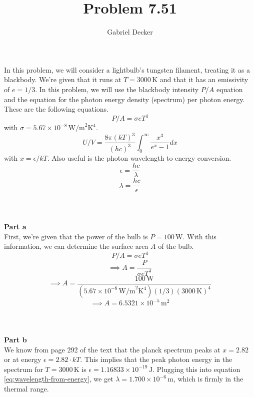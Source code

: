 \documentclass[12pt]{article}
\title{Problem 7.51}
\author{Gabriel Decker}
\begin{document}
\maketitle
\begin{flushleft}



In this problem, we will consider a lightbulb's tungsten filament, treating it as a blackbody.
We're given that it runs at $T=3000\,\text{K}$ and that it has an emissivity of $e=1/3$.
In this problem, we will use the blackbody intensity $P/A$ equation and the equation for the photon energy density (spectrum) per photon energy.
These are the following equations.
\begin{equation}
    P/A=\sigma eT^4
\end{equation}
    with $\sigma=5.67\times10^{-8}\,\text{W/m}^2\text{K}^4$.
\begin{equation}
    U/V=\frac{8\pi(kT)^3}{(hc)^3}\int_0^\infty\frac{x^3}{e^{x}-1}dx
    \label{eq:energy-density}
\end{equation}
with $x=\epsilon/kT$.
Also useful is the photon wavelength to energy conversion.
\begin{equation}
    \epsilon=\frac{hc}{\lambda}
    \label{eq:energy-from-wavelength}
\end{equation}
\begin{equation}
    \lambda=\frac{hc}{\epsilon}
    \label{eq:wavelength-from-energy}
\end{equation}\\~\\~\\


\textbf{Part a}\\
First, we're given that the power of the bulb is $P=100\,\text{W}$.
With this information, we can determine the surface area $A$ of the bulb.
$$P/A=\sigma eT^4$$
$$\implies A=\frac{P}{\sigma eT^4}$$
$$\implies A=\frac{100\,\text{W}}{(5.67\times10^{-8}\,\text{W/m}^2\text{K}^4)(1/3)(3000\,\text{K})^4}$$
$$\implies A=6.5321\times10^{-5}\,\text{m}^2$$\\~\\~\\



\textbf{Part b}\\
We know from page 292 of the text that the planck spectrum peaks at $x=2.82$ or at energy $\epsilon=2.82\cdot kT$.
This implies that the peak photon energy in the spectrum for $T=3000\,\text{K}$ is $\epsilon=1.16833\times10^{-19}\,\text{J}$.
Plugging this into equation \ref{eq:wavelength-from-energy}, we get $\lambda=1.700\times10^{-6}\,\text{m}$, which is firmly in the thermal range.\\~\\~\\




\end{flushleft}
\end{document}
